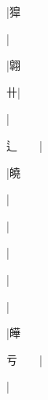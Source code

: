 \begin{multicols}{2}
{{}|{\cjk{}獔}\par
{\cjk{}{\cnsym{}　}{\cnsym{}　}{\cnsym{}　}}|{}\par
{\cjk{}{\cnsym{}　}{\cnsym{}　}{\cnsym{}　}}|{\cjk{}翶}\par
{\cjk{}{\cnsym{}　}{\cnsym{}　}卄}|{}\par
{\cjk{}{\cnsym{}　}{\cnsym{}　}{\cnsym{}　}}|{}\par
{\cjk{}辶{\cnsym{}　}{\cnsym{}　}}|{}\par
{\cjk{}{\cnsym{}　}{\cnsym{}　}{\cnsym{}　}}|{\cjk{}皢}\par
{\cjk{}{\cnsym{}　}{\cnsym{}　}{\cnsym{}　}}|{}\par
{\cjk{}{\cnsym{}　}{\cnsym{}　}{\cnsym{}　}}|{}\par
{\cjk{}{\cnsym{}　}{\cnsym{}　}{\cnsym{}　}}|{}\par
{\cjk{}{\cnsym{}　}{\cnsym{}　}{\cnsym{}　}}|{}\par
{}|{}\par
{\cjk{}{\cnsym{}　}{\cnsym{}　}{\cnsym{}　}}|{\cjk{}皣}\par
{\cjk{}亏{\cnsym{}　}{\cnsym{}　}}|{}\par
{\cjk{}{\cnsym{}　}{\cnsym{}　}{\cnsym{}　}}|{}\par
}
\end{multicols}
